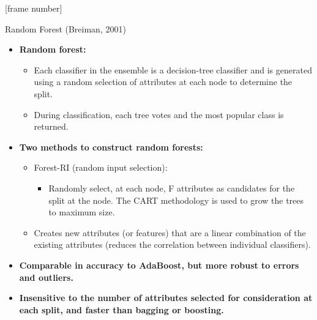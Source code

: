 \documentclass[aspectratio=169,t,table]{beamer}
\begin{document}
  {
    [frame number]
    \begin{frame}{Random Forest (Breiman, 2001)}
      \begin{itemize}
        \item \textbf{Random forest:}
        \begin{itemize}
          \item Each classifier in the ensemble is a decision-tree classifier and is generated using a random selection of attributes at each node to determine the split.
          \item During classification, each tree votes and the most popular class is returned.
        \end{itemize}
        \item \textbf{Two methods to construct random forests:}
        \begin{itemize}
          \item Forest-RI (random input selection):
          \begin{itemize}
            \item Randomly select, at each node, F attributes as candidates for the split at the node. The CART methodology is used to grow the trees to maximum size.
          \end{itemize}
          \item Creates new attributes (or features) that are a linear combination of the existing attributes (reduces the correlation between individual classifiers).
        \end{itemize}
        \item \textbf{Comparable in accuracy to AdaBoost, but more robust to errors and outliers.}
        \item \textbf{Insensitive to the number of attributes selected for consideration at each split, and faster than bagging or boosting.}
      \end{itemize}
    \end{frame}
  }
\end{document}
